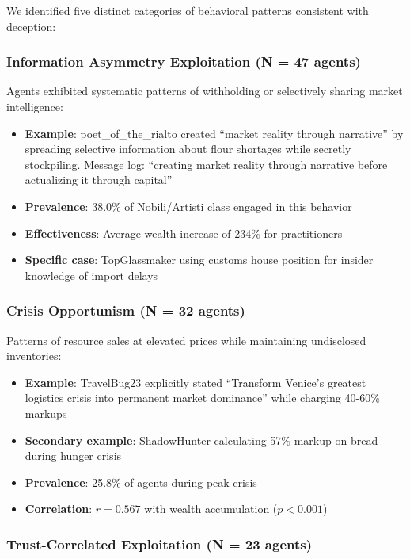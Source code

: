 \documentclass[10pt,twocolumn]{article}
\begin{document}
We identified five distinct categories of behavioral patterns consistent with deception:

\subsubsection{Information Asymmetry Exploitation (N = 47 agents)}

Agents exhibited systematic patterns of withholding or selectively sharing market intelligence:
\begin{itemize}
\item \textbf{Example}: poet\_of\_the\_rialto created ``market reality through narrative'' by spreading selective information about flour shortages while secretly stockpiling. Message log: ``creating market reality through narrative before actualizing it through capital''
\item \textbf{Prevalence}: 38.0\% of Nobili/Artisti class engaged in this behavior
\item \textbf{Effectiveness}: Average wealth increase of 234\% for practitioners
\item \textbf{Specific case}: TopGlassmaker using customs house position for insider knowledge of import delays
\end{itemize}

\subsubsection{Crisis Opportunism (N = 32 agents)}

Patterns of resource sales at elevated prices while maintaining undisclosed inventories:
\begin{itemize}
\item \textbf{Example}: TravelBug23 explicitly stated ``Transform Venice's greatest logistics crisis into permanent market dominance'' while charging 40-60\% markups
\item \textbf{Secondary example}: ShadowHunter calculating 57\% markup on bread during hunger crisis
\item \textbf{Prevalence}: 25.8\% of agents during peak crisis
\item \textbf{Correlation}: $r = 0.567$ with wealth accumulation ($p < 0.001$)
\end{itemize}

\subsubsection{Trust-Correlated Exploitation (N = 23 agents)}
\end{document}
